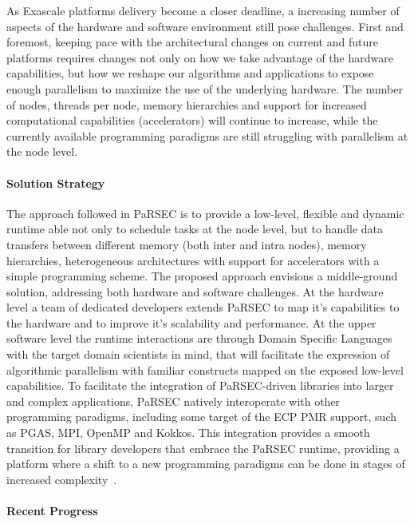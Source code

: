 As Exascale platforms delivery become a closer deadline, a increasing number of
aspects of the hardware and software environment still pose challenges. First
and foremost, keeping pace with the architectural changes on current and future
platforms requires changes not only on how we take advantage of the hardware
capabilities, but how we reshape our algorithms and applications to expose
enough parallelism to maximize the use of the underlying hardware. The number of
nodes, threads per node, memory hierarchies and support for increased
computational capabilities (accelerators) will continue to increase, while the
currently available programming paradigms are still struggling with parallelism
at the node level.

\paragraph{Solution Strategy}
The approach followed in PaRSEC is to provide a low-level, flexible and dynamic
runtime able not only to schedule tasks at the node level, but to handle data
transfers between different memory (both inter and intra nodes), memory
hierarchies, heterogeneous architectures with support for accelerators with a
simple programming scheme. The proposed approach envisions a middle-ground
solution, addressing both hardware and software challenges. At the hardware
level a team of dedicated developers extends PaRSEC to map it's capabilities to
the hardware and to improve it's scalability and performance. At the upper
software level the runtime interactions are through Domain Specific Languages
with the target domain scientists in mind, that will facilitate the expression
of algorithmic parallelism with familiar constructs mapped on the exposed
low-level capabilities. To facilitate the integration of PaRSEC-driven libraries
into larger and complex applications, PaRSEC natively interoperate with other
programming paradigms, including some target of the ECP PMR support, such as
PGAS, MPI, OpenMP and Kokkos. This integration provides a smooth transition for
library developers that embrace the PaRSEC runtime, providing a platform where a
shift to a new programming paradigms can be done in stages of increased
complexity~\cite{lorapo-protools,BLR_LU,parsec_pdgemm}.

\paragraph{Recent Progress}

